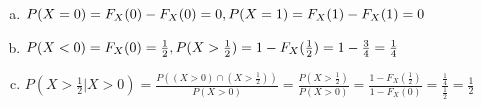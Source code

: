 \documentclass[12pt]{article}
\newenvironment{problem}[2][Problem]{\begin{trivlist}
\item[\hskip \labelsep {\bfseries #1}\hskip \labelsep {\bfseries #2.}]
  \vspace{1 cm}
}{\end{trivlist}}
\begin{document}
\begin{problem}{3.9}
\item
  \begin{enumerate}[a.]
    \item %
      $P(X = 0) = F_X(0)-F_X(0) = 0, \\ P(X=1) = F_X(1)-F_X(1) = 0$
    \item %
      $P(X < 0) = F_X(0) = \frac{1}{2}, \\
      P(X>\frac{1}{2}) = 1 - F_X(\frac{1}{2}) = 1-\frac{3}{4} = \frac{1}{4}$
    \item %
      $P(X>\frac{1}{2} | X > 0) = \frac{P((X > 0)\cap(X >\frac{1}{2}))}{P(X>0)}
      = \frac{P(X>\frac{1}{2})}{P(X>0)} = \frac{1-F_X(\frac{1}{2})}{1-F_X(0)} 
      = \frac{\frac{1}{4}}{\frac{1}{2}} = \frac{1}{2}$ 
  \end{enumerate}
\end{problem}
\end{document}
